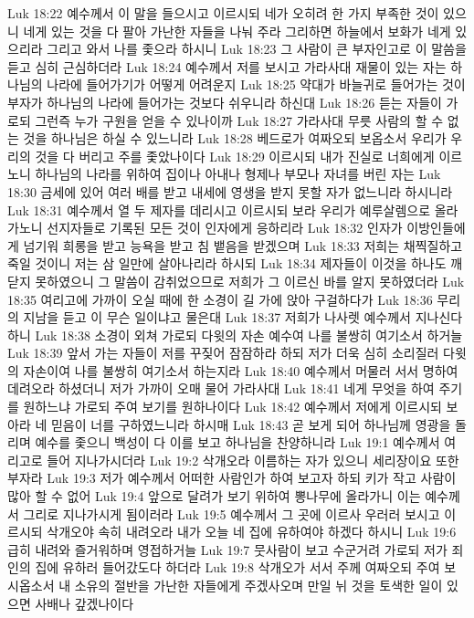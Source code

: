 Luk 18:22  예수께서 이 말을 들으시고 이르시되 네가 오히려 한 가지 부족한 것이 있으니 네게 있는 것을 다 팔아 가난한 자들을 나눠 주라 그리하면 하늘에서 보화가 네게 있으리라 그리고 와서 나를 좇으라 하시니
Luk 18:23  그 사람이 큰 부자인고로 이 말씀을 듣고 심히 근심하더라
Luk 18:24  예수께서 저를 보시고 가라사대 재물이 있는 자는 하나님의 나라에 들어가기가 어떻게 어려운지
Luk 18:25  약대가 바늘귀로 들어가는 것이 부자가 하나님의 나라에 들어가는 것보다 쉬우니라 하신대
Luk 18:26  듣는 자들이 가로되 그런즉 누가 구원을 얻을 수 있나이까
Luk 18:27  가라사대 무릇 사람의 할 수 없는 것을 하나님은 하실 수 있느니라
Luk 18:28  베드로가 여짜오되 보옵소서 우리가 우리의 것을 다 버리고 주를 좇았나이다
Luk 18:29  이르시되 내가 진실로 너희에게 이르노니 하나님의 나라를 위하여 집이나 아내나 형제나 부모나 자녀를 버린 자는
Luk 18:30  금세에 있어 여러 배를 받고 내세에 영생을 받지 못할 자가 없느니라 하시니라
Luk 18:31  예수께서 열 두 제자를 데리시고 이르시되 보라 우리가 예루살렘으로 올라가노니 선지자들로 기록된 모든 것이 인자에게 응하리라
Luk 18:32  인자가 이방인들에게 넘기워 희롱을 받고 능욕을 받고 침 뱉음을 받겠으며
Luk 18:33  저희는 채찍질하고 죽일 것이니 저는 삼 일만에 살아나리라 하시되
Luk 18:34  제자들이 이것을 하나도 깨닫지 못하였으니 그 말씀이 감취었으므로 저희가 그 이르신 바를 알지 못하였더라
Luk 18:35  여리고에 가까이 오실 때에 한 소경이 길 가에 앉아 구걸하다가
Luk 18:36  무리의 지남을 듣고 이 무슨 일이냐고 물은대
Luk 18:37  저희가 나사렛 예수께서 지나신다 하니
Luk 18:38  소경이 외쳐 가로되 다윗의 자손 예수여 나를 불쌍히 여기소서 하거늘
Luk 18:39  앞서 가는 자들이 저를 꾸짖어 잠잠하라 하되 저가 더욱 심히 소리질러 다윗의 자손이여 나를 불쌍히 여기소서 하는지라
Luk 18:40  예수께서 머물러 서서 명하여 데려오라 하셨더니 저가 가까이 오매 물어 가라사대
Luk 18:41  네게 무엇을 하여 주기를 원하느냐 가로되 주여 보기를 원하나이다
Luk 18:42  예수께서 저에게 이르시되 보아라 네 믿음이 너를 구하였느니라 하시매
Luk 18:43  곧 보게 되어 하나님께 영광을 돌리며 예수를 좇으니 백성이 다 이를 보고 하나님을 찬양하니라
Luk 19:1  예수께서 여리고로 들어 지나가시더라
Luk 19:2  삭개오라 이름하는 자가 있으니 세리장이요 또한 부자라
Luk 19:3  저가 예수께서 어떠한 사람인가 하여 보고자 하되 키가 작고 사람이 많아 할 수 없어
Luk 19:4  앞으로 달려가 보기 위하여 뽕나무에 올라가니 이는 예수께서 그리로 지나가시게 됨이러라
Luk 19:5  예수께서 그 곳에 이르사 우러러 보시고 이르시되 삭개오야 속히 내려오라 내가 오늘 네 집에 유하여야 하겠다 하시니
Luk 19:6  급히 내려와 즐거워하며 영접하거늘
Luk 19:7  뭇사람이 보고 수군거려 가로되 저가 죄인의 집에 유하러 들어갔도다 하더라
Luk 19:8  삭개오가 서서 주께 여짜오되 주여 보시옵소서 내 소유의 절반을 가난한 자들에게 주겠사오며 만일 뉘 것을 토색한 일이 있으면 사배나 갚겠나이다
